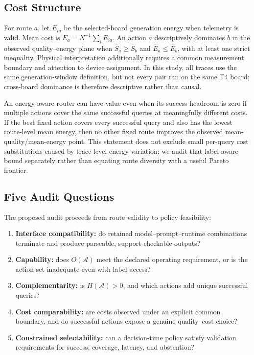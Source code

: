 \subsection{Cost Structure}

For route $a$, let $E_{ia}$ be the selected-board generation energy when telemetry
is valid. Mean cost is $\bar E_a=N^{-1}\sum_iE_{ia}$. An action $a$ descriptively
dominates $b$ in the observed quality--energy plane when
$\bar S_a\geq\bar S_b$ and $\bar E_a\leq\bar E_b$, with at least one strict
inequality. Physical interpretation additionally requires a common measurement
boundary and attention to device assignment. In this study, all traces use the
same generation-window definition, but not every pair ran on the same T4 board;
cross-board dominance is therefore descriptive rather than causal.

An energy-aware router can have value even when its success headroom is zero if
multiple actions cover the same successful queries at meaningfully different
costs. If the best fixed action covers every successful query and also has the
lowest route-level mean energy, then no other fixed route improves the observed
mean-quality/mean-energy point. This statement does not exclude small per-query
cost substitutions caused by trace-level energy variation; we audit that
label-aware bound separately rather than equating route diversity with a useful
Pareto frontier.

\subsection{Five Audit Questions}

The proposed audit proceeds from route validity to policy feasibility:

\begin{enumerate}
    \item \textbf{Interface compatibility:} do retained model--prompt--runtime
    combinations terminate and produce parseable, support-checkable outputs?
    \item \textbf{Capability:} does $O(\mathcal{A})$ meet the declared operating
    requirement, or is the action set inadequate even with label access?
    \item \textbf{Complementarity:} is $H(\mathcal{A})>0$, and which actions add
    unique successful queries?
    \item \textbf{Cost comparability:} are costs observed under an explicit common
    boundary, and do successful actions expose a genuine quality--cost choice?
    \item \textbf{Constrained selectability:} can a decision-time policy satisfy
    validation requirements for success, coverage, latency, and abstention?
\end{enumerate}

